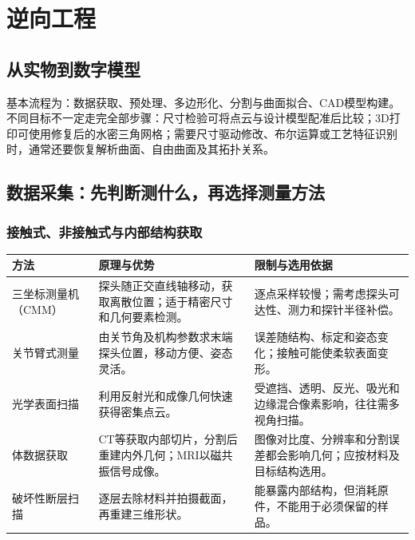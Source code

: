 \chapter{逆向工程}
\label{chap:reverse-engineering}
\label{ch:reverse}


\section{从实物到数字模型}

基本流程为：数据获取、预处理、多边形化、分割与曲面拟合、CAD模型构建。不同目标不一定走完全部步骤：尺寸检验可将点云与设计模型配准后比较；3D打印可使用修复后的水密三角网格；需要尺寸驱动修改、布尔运算或工艺特征识别时，通常还要恢复解析曲面、自由曲面及其拓扑关系。

\section{数据采集：先判断测什么，再选择测量方法}
\subsection{接触式、非接触式与内部结构获取}
\begin{table}[H]
\centering\small
\begin{tabularx}{\linewidth}{@{}p{2.4cm} X X@{}}
\toprule
方法 & 原理与优势 & 限制与选用依据 \\
\midrule
三坐标测量机（CMM） & 探头随正交直线轴移动，获取离散位置；适于精密尺寸和几何要素检测。 & 逐点采样较慢；需考虑探头可达性、测力和探针半径补偿。 \\
关节臂式测量 & 由关节角及机构参数求末端探头位置，移动方便、姿态灵活。 & 误差随结构、标定和姿态变化；接触可能使柔软表面变形。 \\
光学表面扫描 & 利用反射光和成像几何快速获得密集点云。 & 受遮挡、透明、反光、吸光和边缘混合像素影响，往往需多视角扫描。 \\
体数据获取 & CT等获取内部切片，分割后重建内外几何；MRI以磁共振信号成像。 & 图像对比度、分辨率和分割误差都会影响几何；应按材料及目标结构选用。 \\
破坏性断层扫描 & 逐层去除材料并拍摄截面，再重建三维形状。 & 能暴露内部结构，但消耗原件，不能用于必须保留的样品。 \\
\bottomrule
\end{tabularx}
\end{table}


